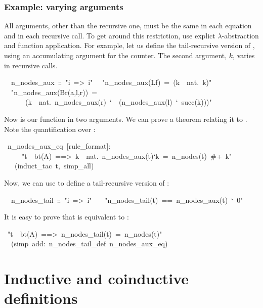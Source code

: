 \subsubsection{Example: varying arguments}

All arguments, other than the recursive one, must be the same in each equation
and in each recursive call.  To get around this restriction, use explict
$\lambda$-abstraction and function application.  For example, let us
define the tail-recursive version of , using an 
accumulating argument for the counter.  The second argument, $k$, varies in
recursive calls.
\begin{isabelle}
\ \ n\_nodes\_aux\ ::\ "i\ =>\ i"\isanewline
{}\isanewline
\ \ "n\_nodes\_aux(Lf)\ =\ (\isasymlambda k\ \isasymin \ nat.\ k)"\isanewline
\ \ "n\_nodes\_aux(Br(a,l,r))\ =\ \isanewline
\ \ \ \ \ \ (\isasymlambda k\ \isasymin \ nat.\ n\_nodes\_aux(r)\ `\ \ (n\_nodes\_aux(l)\ `\ succ(k)))"
\end{isabelle}
Now  is our function in two arguments. We
can prove a theorem relating it to . Note the quantification
over :
\begin{isabelle}
\ n\_nodes\_aux\_eq\ [rule\_format]:\isanewline
\ \ \ \ \ "t\ \isasymin \ bt(A)\ ==>\ \isasymforall k\ \isasymin \ nat.\ n\_nodes\_aux(t)`k\ =\ n\_nodes(t)\ \#+\ k"\isanewline
\ \ \ (induct\_tac\ t,\ simp\_all)
\end{isabelle}

Now, we can use  to define a tail-recursive version
of :
\begin{isabelle}
\isanewline
\ \ n\_nodes\_tail\ ::\ "i\ =>\ i"\isanewline
\ \ \ "n\_nodes\_tail(t)\ ==\ n\_nodes\_aux(t)\ `\ 0"
\end{isabelle}
It is easy to
prove that  is equivalent to :
\begin{isabelle}
\ "t\ \isasymin \ bt(A)\ ==>\ n\_nodes\_tail(t)\ =\ n\_nodes(t)"\isanewline
\ \ (simp\ add:\ n\_nodes\_tail\_def\ n\_nodes\_aux\_eq)
\end{isabelle}






\section{Inductive and coinductive definitions}

